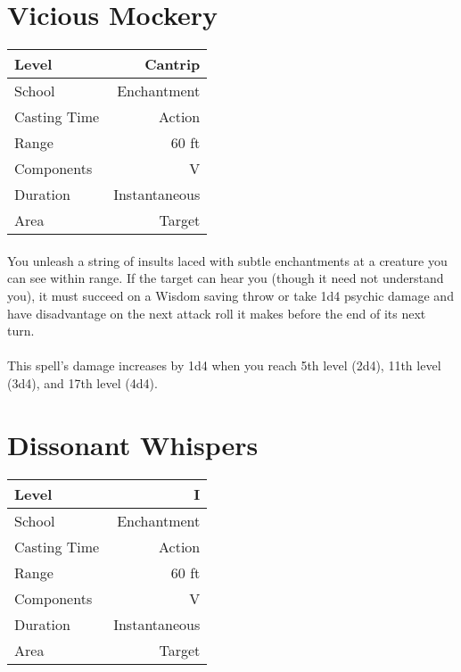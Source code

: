 \documentclass[a5paper,12pt]{article}
\begin{document}
\newpage

\section*{Vicious Mockery}
\begin{table}[h]
   \centering
   \begin{tabular}{|l|r|}
      \hline
      Level        & Cantrip \\
      \hline
      School       & Enchantment\\
      \hline
      Casting Time & Action \\
      \hline
      Range        & 60 ft \\
      \hline
      Components   & V \\
      \hline
      Duration     & Instantaneous\\
      \hline
      Area         & Target \\
      \hline
   \end{tabular}
\end{table}

\paragraph{}
You unleash a string of insults laced with subtle enchantments at a creature you can see within range. If the target can hear you (though it need not understand you), it must succeed on a Wisdom saving throw or take 1d4 psychic damage and have disadvantage on the next attack roll it makes before the end of its next turn.

\paragraph{}
This spell's damage increases by 1d4 when you reach 5th level (2d4), 11th level (3d4), and 17th level (4d4).

\newpage

\section*{Dissonant Whispers}
\begin{table}[h]
   \centering
   \begin{tabular}{|l|r|}
      \hline
      Level        & I \\
      \hline
      School       & Enchantment\\
      \hline
      Casting Time & Action \\
      \hline
      Range        & 60 ft \\
      \hline
      Components   & V \\
      \hline
      Duration     & Instantaneous\\
      \hline
      Area         & Target \\
      \hline
   \end{tabular}
\end{table}
\end{document}
